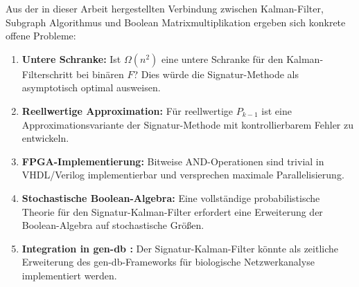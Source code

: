 ﻿\documentclass[a4paper,12pt]{article}
\theoremstyle{definition}
\begin{document}
Aus der in dieser Arbeit hergestellten Verbindung zwischen Kalman-Filter, Subgraph
Algorithmus \cite{epp2026} und Boolean Matrixmultiplikation \cite{epp2026boolmm}
ergeben sich konkrete offene Probleme:
\begin{enumerate}
    \item \textbf{Untere Schranke:} Ist $\Omega(n^2)$ eine untere Schranke für den
          Kalman-Filterschritt bei binären $F$? Dies würde die Signatur-Methode als
          asymptotisch optimal ausweisen.
    \item \textbf{Reellwertige Approximation:} Für reellwertige $P_{k-1}$ ist eine
          Approximationsvariante der Signatur-Methode mit kontrollierbarem Fehler zu entwickeln.
    \item \textbf{FPGA-Implementierung:} Bitweise AND-Operationen sind trivial in
          VHDL/Verilog implementierbar und versprechen maximale Parallelisierung.
    \item \textbf{Stochastische Boolean-Algebra:} Eine vollständige probabilistische
          Theorie für den Signatur-Kalman-Filter erfordert eine Erweiterung der
          Boolean-Algebra auf stochastische Größen.
    \item \textbf{Integration in gen-db \cite{epp2026bio}:} Der Signatur-Kalman-Filter
          könnte als zeitliche Erweiterung des gen-db-Frameworks für biologische
          Netzwerkanalyse implementiert werden.
\end{enumerate}
\end{document}
